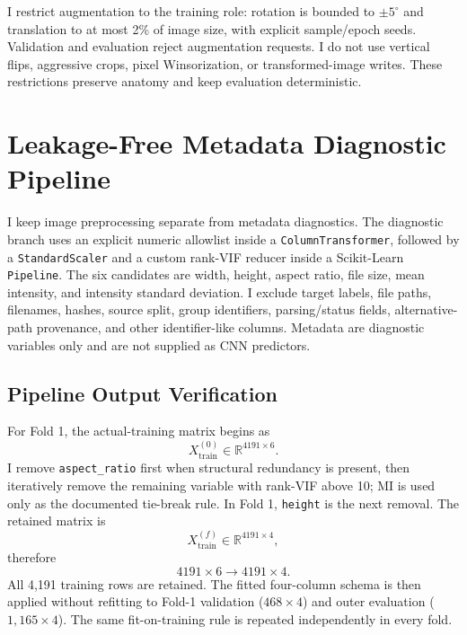 \documentclass[conference]{IEEEtran}
\begin{document}
I restrict augmentation to the training role: rotation is bounded to $\pm5^{\circ}$ and translation to at most 2\% of image size, with explicit sample/epoch seeds. Validation and evaluation reject augmentation requests. I do not use vertical flips, aggressive crops, pixel Winsorization, or transformed-image writes. These restrictions preserve anatomy and keep evaluation deterministic.

\section{Leakage-Free Metadata Diagnostic Pipeline}

I keep image preprocessing separate from metadata diagnostics. The diagnostic branch uses an explicit numeric allowlist inside a \texttt{ColumnTransformer}, followed by a \texttt{StandardScaler} and a custom rank-VIF reducer inside a Scikit-Learn \texttt{Pipeline}. The six candidates are width, height, aspect ratio, file size, mean intensity, and intensity standard deviation. I exclude target labels, file paths, filenames, hashes, source split, group identifiers, parsing/status fields, alternative-path provenance, and other identifier-like columns. Metadata are diagnostic variables only and are not supplied as CNN predictors.

\subsection{Pipeline Output Verification}

For Fold 1, the actual-training matrix begins as
\begin{equation}
X_{\mathrm{train}}^{(0)}\in\mathbb{R}^{4191\times6}.
\end{equation}
I remove \texttt{aspect\_ratio} first when structural redundancy is present, then iteratively remove the remaining variable with rank-VIF above 10; MI is used only as the documented tie-break rule. In Fold 1, \texttt{height} is the next removal. The retained matrix is
\begin{equation}
X_{\mathrm{train}}^{(f)}\in\mathbb{R}^{4191\times4},
\end{equation}
therefore
\begin{equation}
\boxed{4191\times6\rightarrow4191\times4}.
\end{equation}
All 4,191 training rows are retained. The fitted four-column schema is then applied without refitting to Fold-1 validation ($468\times4$) and outer evaluation ($1{,}165\times4$). The same fit-on-training rule is repeated independently in every fold.
\end{document}
